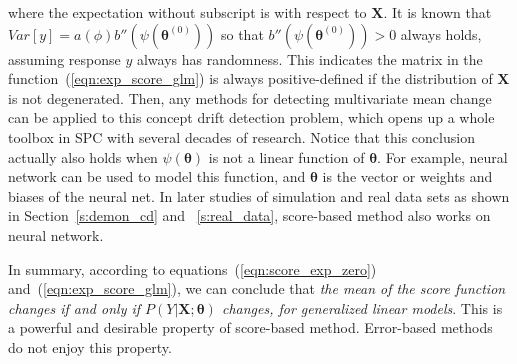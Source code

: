 \documentclass[twoside,11pt]{article}
\begin{document}
where the expectation without subscript is with respect to $\bm {X}$. It is known that $Var[y] = a ( \phi)b''(\psi ( \bm { \theta} ^{ (0)}))$ so that $b''(\psi ( \bm { \theta} ^{ (0)}))>0$ always holds, assuming response $y$ always has randomness. This indicates the matrix in the function~(\ref{eqn:exp_score_glm}) is always positive-defined if the distribution of $\bm {X}$ is not degenerated. Then, any methods for detecting multivariate mean change can be applied to this concept drift detection problem, which opens up a whole toolbox in SPC with several decades of research. Notice that this conclusion actually also holds when $ \psi ( \bm { \theta})$ is not a linear function of $\bm { \theta}$. For example, neural network can be used to model this function, and $\bm { \theta}$ is the vector or weights and biases of the neural net. In later studies of simulation and real data sets as shown in Section~\ref{s:demon_cd} and ~\ref{s:real_data}, score-based method also works on neural network.

In summary, according to equations~(\ref{eqn:score_exp_zero}) and~(\ref{eqn:exp_score_glm}), we can conclude that \textit{the mean of the score function changes if and only if $P(Y|\bm{X};\bm{\theta})$ changes, for generalized linear models}. This is a powerful and desirable property of score-based method. Error-based methods do not enjoy this property. 
\end{document}
